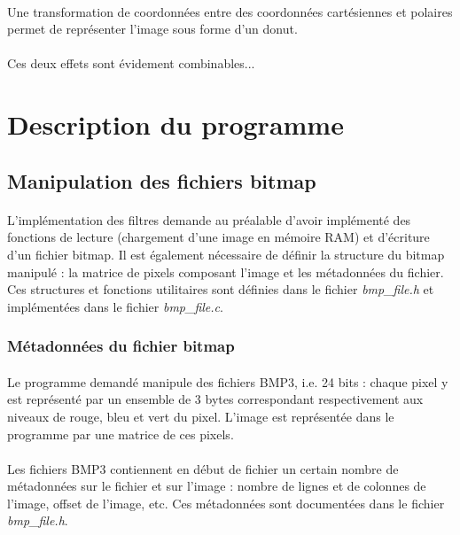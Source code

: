 \documentclass{article}
\begin{document}
    \paragraph{}
    Une transformation de coordonnées entre des coordonnées cartésiennes et polaires permet de représenter l’image sous forme d’un donut.
    
    \paragraph{}
    Ces deux effets sont évidement combinables...




    \newpage
    \section{Description du programme}
    \subsection{Manipulation des fichiers bitmap}
    \paragraph{}
    L'implémentation des filtres demande au préalable d'avoir implémenté des fonctions de lecture (chargement d'une image en mémoire RAM) et d'écriture d'un fichier bitmap. Il est également nécessaire de définir la structure du bitmap manipulé : la matrice de pixels composant l'image et les métadonnées du fichier. Ces structures et fonctions utilitaires sont définies dans le fichier \emph{bmp\_file.h} et implémentées dans le fichier \emph{bmp\_file.c}.


    \subsubsection{Métadonnées du fichier bitmap}
    \paragraph{}
    Le programme demandé manipule des fichiers BMP3, i.e. 24 bits : chaque pixel y est représenté par un ensemble de 3 bytes correspondant respectivement aux niveaux de rouge, bleu et vert du pixel. L'image est représentée dans le programme par une matrice de ces pixels.

    \paragraph{}
    Les fichiers BMP3 contiennent en début de fichier un certain nombre de métadonnées sur le fichier et sur l'image : nombre de lignes et de colonnes de l'image, offset de l'image, etc. Ces métadonnées sont documentées dans le fichier \emph{bmp\_file.h}.
    
\end{document}
